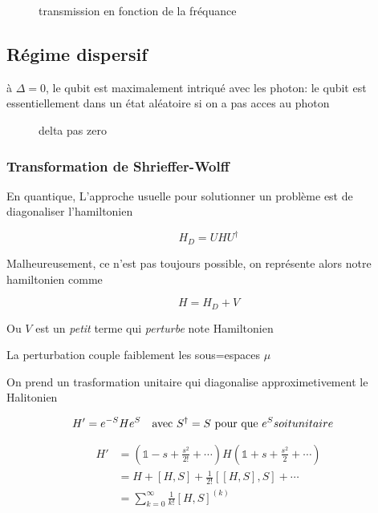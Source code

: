 \begin{figure}[ht]
    \centering
    \caption{transmission en fonction de la fréquance}
    \label{fig:transmission-en-fonction-de-la-fréquance}
\end{figure}


\subsection{Régime dispersif}

à $\Delta=0$, le qubit est maximalement intriqué avec les photon: le qubit est essentiellement dans un état aléatoire si on a pas acces au photon


\begin{figure}[ht]
    \centering
    \caption{delta pas zero}
    \label{fig:delta-pas-zero}
\end{figure}


\subsubsection{Transformation de Shrieffer-Wolff}


En quantique, L'approche usuelle pour solutionner un problème est de diagonaliser l'hamiltonien 

\[ H_D = U H U^{\dagger}  \]

Malheureusement, ce n'est pas toujours possible, on représente alors notre hamiltonien comme

\[ H = H_D + V \]

Ou $V$ est un \textit{petit} terme qui \textit{perturbe} note Hamiltonien

La perturbation couple faiblement les sous=espaces $\mu$


On prend un trasformation unitaire qui diagonalise approximetivement le Halitonien 

\[ H' = e^{-S} H e^{S} \qq{avec $S^{\dagger} = S$ pour que $e^{S} soit unitaire$} \]


\begin{align*}
    H' &= \left( \mathds{1} -s + \frac{s^2}{2!} + \dotsb  \right) H \left( \mathds{1} + s + \frac{s^2}{2} + \dotsb  \right) \\
       &= H + [H, S] + \frac{1}{2!} [[H, S], S] + \dotsb\\
    &= \sum_{k=0}^{\infty}\frac{1}{k!} [H, S]^{(k)} 
\end{align*}



